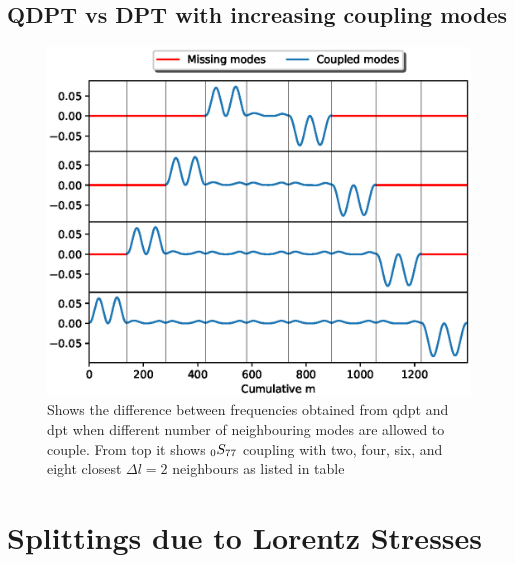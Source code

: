 \subsection{QDPT vs DPT with increasing coupling modes}

\begin{figure}[h!]
\includegraphics[scale=0.9, center]{Chapter4/figs/qdpt_err}
\caption{Shows the difference between frequencies obtained from qdpt and dpt when different number of neighbouring modes are allowed to couple. From top it shows $_{0}S_{77}$ coupling with two, four, six, and eight closest $\Delta l=2$ neighbours as listed in table}
\label{fig:qdpt_err}
\end{figure}

\section{Splittings due to Lorentz Stresses} %
